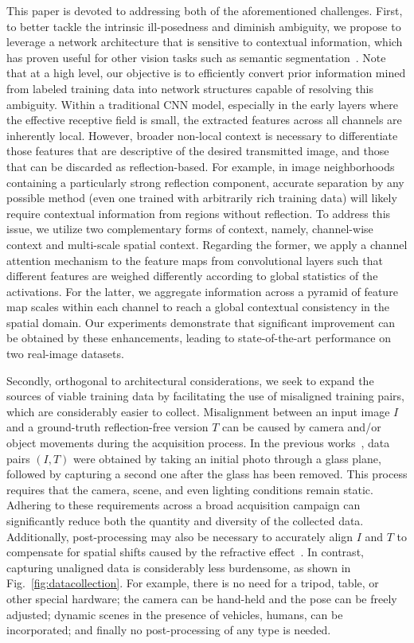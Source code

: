 \documentclass[10pt,twocolumn,letterpaper]{article}
\begin{document}
This paper is devoted to addressing both of the aforementioned challenges.  First, to better tackle the intrinsic ill-posedness and diminish ambiguity, we propose to leverage a network architecture that is sensitive to contextual information, which has proven useful for other vision tasks such as semantic segmentation~\cite{He2015Spatial,zhao2017pyramid,Zhang_2018_CVPR,Hu_2018_CVPR}. Note that at a high level, our objective is to efficiently convert prior information mined from labeled training data into network structures capable of resolving this ambiguity.  Within a traditional CNN model, especially in the early layers where the effective receptive field is small, the extracted features across all channels are inherently local.  However, broader non-local context is necessary to differentiate those features that are descriptive of the desired transmitted image, and those that can be discarded as reflection-based.  For example, in image neighborhoods containing a particularly strong reflection component, accurate separation by any possible method (even one trained with arbitrarily rich training data) will likely require contextual information from regions without reflection.  To address this issue, we utilize two complementary forms of context, namely, channel-wise context and multi-scale spatial context. Regarding the former, we apply a channel attention mechanism to the feature maps from convolutional layers such that different features are weighed differently according to global statistics of the activations. For the latter, we aggregate information across a pyramid of feature map scales within each channel to reach a global contextual consistency in the spatial domain. Our experiments demonstrate that significant improvement can be obtained by these enhancements, leading to state-of-the-art performance on two real-image datasets. 

Secondly, orthogonal to architectural considerations, we seek to expand the sources of viable training data by facilitating the use of misaligned training pairs, which are considerably easier to collect.  Misalignment between an input image $I$ and a ground-truth reflection-free version $T$ can be caused by camera and/or object movements during the acquisition process.  In the previous works~\cite{Wan_2017_ICCV,Zhang_2018_CVPR}, data pairs $(I,T)$ were obtained by taking an initial photo through a glass plane, followed by capturing a second one after the glass has been removed.  This process requires that the camera, scene, and even lighting conditions remain static. Adhering to these requirements across a broad acquisition campaign can significantly reduce both the quantity and diversity of the collected data. Additionally, post-processing may also be necessary to accurately align $I$ and $T$ to compensate for spatial shifts caused by the refractive effect~\cite{Wan_2017_ICCV}. In contrast, capturing unaligned data is considerably less burdensome, as shown in Fig.~\ref{fig:datacollection}.  For example, there is no need for a tripod, table, or other special hardware; the camera can be hand-held and the pose can be freely adjusted; dynamic scenes in the presence of vehicles, humans, \etc can be incorporated; and finally no post-processing of any type is needed.
\end{document}
